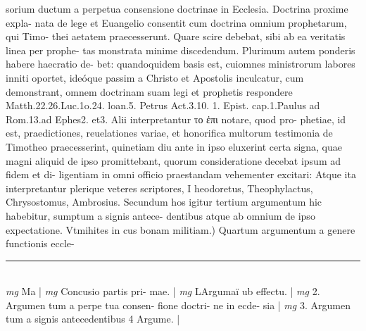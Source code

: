 \documentclass{article}
\begin{document}
\begin{pages}
sorium ductum a perpetua consensione doctrinae in Ecclesia. Doctrina proxime expla- nata de lege et Euangelio consentit cum doctrina omnium prophetarum, qui Timo- thei aetatem praecesserunt. Quare scire debebat, sibi ab ea veritatis linea per prophe- tas monstrata minime discedendum. Plurimum autem ponderis habere haecratio de- bet: quandoquidem basis est, cuiomnes ministrorum labores inniti oportet, ideóque  passim a Christo et Apostolis inculcatur, cum demonstrant, omnem doctrinam suam legi et prophetis respondere Matth.22.26.Luc.1o.24. loan.5. Petrus Act.3.10. 1. Epist. cap.1.Paulus ad Rom.13.ad Ephes2. et3. Alii interpretantur το ἐπι notare, quod pro- phetiae, id est, praedictiones, reuelationes variae, et honorifica multorum testimonia de Timotheo praecesserint, quinetiam diu ante in ipso eluxerint certa signa, quae magni aliquid de ipso promittebant, quorum consideratione decebat ipsum ad fidem et di- ligentiam in omni officio praestandam vehementer excitari: Atque  ita interpretantur plerique  veteres scriptores, I heodoretus, Theophylactus, Chrysostomus, Ambrosius. Secundum hos igitur tertium argumentum hic habebitur, sumptum a signis antece- dentibus atque  ab omnium de ipso expectatione.  \pend\pstart Vtmihites in cus bonam militiam.) Quartum argumentum a genere functionis eccle-  \pend
\vspace{0.5cm}\noindent
\vspace{0.2cm}\rule{1cm}{0.2pt}\\ 
\hspace{0.2cm}\textit{mg}
\footnotesize Ma 
\normalsize| 
\hspace{0.2cm}\textit{mg}
\footnotesize Concusio partis pri- mae. 
\normalsize| 
\hspace{0.2cm}\textit{mg}
\footnotesize LArgumaï ub effectu. 
\normalsize| 
\hspace{0.2cm}\textit{mg}
\footnotesize 2. Argumen tum a perpe tua consen- fione doctri- ne in ecde- sia 
\normalsize| 
\hspace{0.2cm}\textit{mg}
\footnotesize 3. Argumen tum a signis antecedentibus  4 Argume. 
\normalsize| 

\end{pages}
\end{document}
